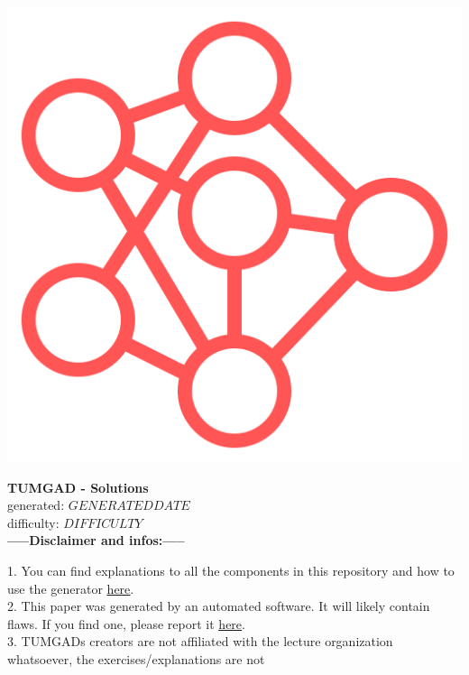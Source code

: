 \documentclass[12pt]{article}
\begin{document}
    \begin{center}
        \includegraphics[scale=0.25]{faviconRed.png} %
        \vspace{15px}

        {\selectfont
            \textbf{\LARGE{TUMGAD - Solutions}}\\
            generated: $GENERATEDDATE$
            \\
            difficulty: $DIFFICULTY$
            \\
        }
        \vspace{20px}
        \textbf{\LARGE{-----Disclaimer and infos:-----}}
        \\[0.2in]
    \end{center}
    1. You can find explanations to all the components in this repository and how to use the generator \href{https://sebastianoner.github.io/TUMGAD/src/routes}{\underline{here}}.
    \\[0.2in]
    2. This paper was generated by an automated software.
    It will likely contain flaws.
    If you find one, please report it \href{https://github.com/SebastianOner/TUMGAD/issues/new?assignees=&labels=&template=bug_report.md&title=}{\underline{here}}.
    \\[0.2in]
    3. TUMGADs creators are not affiliated with the lecture organization whatsoever, the exercises/explanations are not
\end{document}
